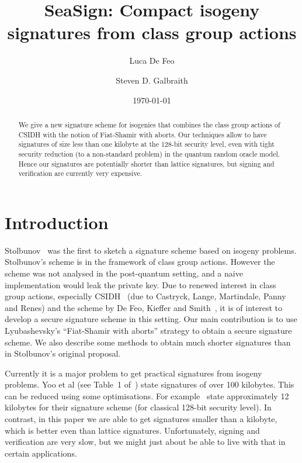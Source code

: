 \documentclass{llncs}
\title{SeaSign: Compact isogeny signatures from class group actions}
\author{Luca De Feo \and Steven D. Galbraith}
\institute{Mathematics Department, University of Auckland, NZ.
\email{s.galbraith@auckland.ac.nz}
\and
Universit{\' e} de Versailles -- Saint-Quentin, Paris, France.
\email{luca.de-feo@uvsq.fr}}
\date{\today}
\begin{document}
\pagestyle{plain}

\maketitle


\begin{abstract}
We give a new signature scheme for isogenies that combines the class group actions of CSIDH with the notion of Fiat-Shamir with aborts.
Our techniques allow to have signatures of size less than one kilobyte at the 128-bit security level, even with tight security reduction (to a non-standard problem) in the quantum random oracle model.
Hence our signatures are potentially shorter than lattice signatures, but signing and verification are currently very expensive.
\end{abstract}



\section{Introduction}

Stolbunov~\cite{Sto12} was the first to sketch a signature scheme based on isogeny problems.
Stolbunov's scheme is in the framework of class group actions.
However the scheme was not analysed in the post-quantum setting, and a naive implementation would leak the private key.
Due to renewed interest in class group actions, especially CSIDH~\cite{CLMPR18} (due to Castryck, Lange, Martindale, Panny and Renes) and the scheme by De Feo, Kieffer and Smith~\cite{DFKS18}, it is of interest to develop a secure signature scheme in this setting.
Our main contribution is to use Lyubashevsky's ``Fiat-Shamir with aborts'' strategy to obtain a secure signature scheme.
We also describe some methods to obtain much shorter signatures than in Stolbunov's original proposal.




Currently it is a major problem to get practical signatures from isogeny problems.
Yoo et al (see Table~1 of~\cite{YAJJS17}) state signatures of over 100 kilobytes.
This can be reduced using some optimisations. For example~\cite{GPS17} state approximately 12 kilobytes for their signature scheme (for classical 128-bit security level).
In contrast, in this paper we are able to get signatures smaller than a kilobyte, which is better even than lattice signatures.
Unfortunately, signing and verification are very slow, but we might just about be able to live with that in certain applications.
\end{document}
